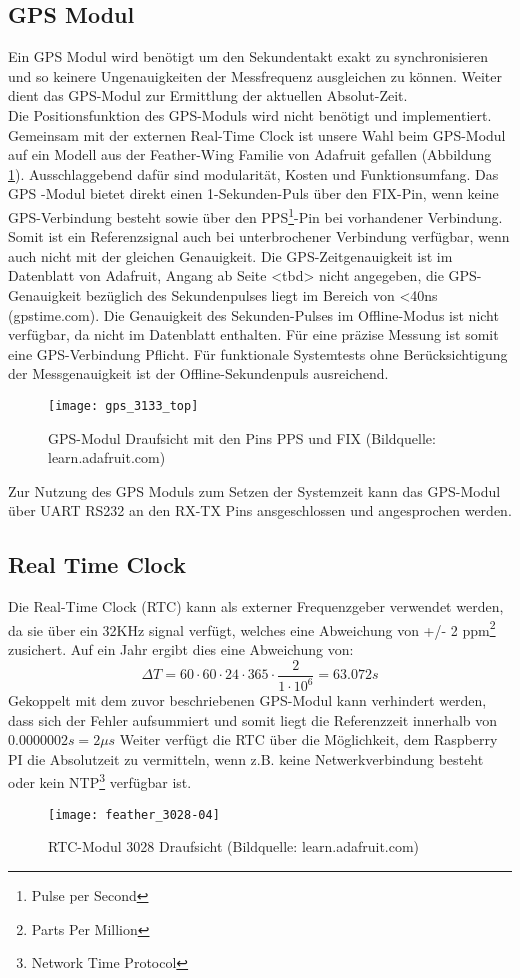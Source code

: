 \subsection{GPS Modul}
	Ein GPS Modul wird benötigt um den Sekundentakt exakt zu synchronisieren und so keinere Ungenauigkeiten der Messfrequenz ausgleichen zu können. Weiter dient das GPS-Modul zur Ermittlung der aktuellen Absolut-Zeit.\\
	Die Positionsfunktion des GPS-Moduls wird nicht benötigt und implementiert. Gemeinsam mit der externen Real-Time Clock ist unsere Wahl beim GPS-Modul auf ein Modell aus der Feather-Wing Familie von Adafruit gefallen (Abbildung \ref{fig:GPS3133}). Ausschlaggebend dafür sind modularität, Kosten und Funktionsumfang. Das GPS -Modul bietet direkt einen 1-Sekunden-Puls über den FIX-Pin, wenn keine GPS-Verbindung besteht sowie über den PPS\footnote{Pulse per Second}-Pin bei vorhandener Verbindung. Somit ist ein Referenzsignal auch bei unterbrochener Verbindung verfügbar, wenn auch nicht mit der gleichen Genauigkeit. Die GPS-Zeitgenauigkeit ist im Datenblatt von Adafruit, Angang ab Seite <tbd> nicht angegeben, die GPS-Genauigkeit bezüglich des Sekundenpulses liegt im Bereich von <40ns (gpstime.com). Die Genauigkeit des Sekunden-Pulses im Offline-Modus ist nicht verfügbar, da nicht im Datenblatt enthalten. Für eine präzise Messung ist somit eine GPS-Verbindung Pflicht. Für funktionale Systemtests ohne Berücksichtigung der Messgenauigkeit ist der Offline-Sekundenpuls ausreichend.
		\begin{figure}[H]
        	\centering
        	\texttt{[image: gps\_3133\_top]}
        	\caption{GPS-Modul Draufsicht mit den Pins PPS und FIX (Bildquelle: learn.adafruit.com)}
        	\label{fig:GPS3133}
    	\end{figure}
	Zur Nutzung des GPS Moduls zum Setzen der Systemzeit kann das GPS-Modul über UART RS232 an den RX-TX Pins ansgeschlossen und angesprochen werden.
%
%	
\subsection{Real Time Clock}
\label{cap:RTC}
	Die Real-Time Clock (RTC) kann als externer Frequenzgeber verwendet werden, da sie über ein 32KHz signal verfügt, welches eine Abweichung von +/- 2 ppm\footnote{Parts Per Million} zusichert. Auf ein Jahr ergibt dies eine Abweichung von:
	\[
		\Delta{T} = 60 \cdot 60 \cdot 24 \cdot 365 \cdot \frac{2}{1\cdot 10^6} = 63.072s
	\]
	Gekoppelt mit dem zuvor beschriebenen GPS-Modul kann verhindert werden, dass sich der Fehler aufsummiert und somit liegt die Referenzzeit innerhalb von $0.0000002s = 2\mu{s}$ 
	Weiter verfügt die RTC über die Möglichkeit, dem Raspberry PI die Absolutzeit zu vermitteln, wenn z.B. keine Netwerkverbindung besteht oder kein NTP\footnote{Network Time Protocol} verfügbar ist.
		\begin{figure}[H]
        	\centering
        	\texttt{[image: feather\_3028-04]}
        	\caption{RTC-Modul 3028 Draufsicht (Bildquelle: learn.adafruit.com)}
        	\label{fig:RTC3028}
    	\end{figure}
%
%
